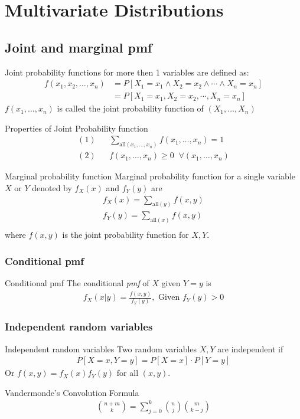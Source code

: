 \documentclass[16pt,a4paper]{article}
\begin{document}
\section{Multivariate Distributions}
\subsection{Joint and marginal pmf}
Joint probability functions for more then 1 variables are defined as: 
\begin{align*}
f(x_1, x_2, \ldots, x_n) &= P[X_1 = x_1 \wedge X_2 = x_2 \wedge \cdots \wedge X_n = x_n]\\
&= P[X_1 = x_1 , X_2 = x_2 , \cdots , X_n = x_n]
\end{align*} 
$f(x_1, \ldots, x_n)$ is called the joint probability function of $(X_1, \ldots, X_n)$ 

\begin{defn}{Properties of Joint Probability function}
\begin{align*}
(1) && \sum_{\mathrm{all}(x_1, \ldots, x_n)}f(x_1, \ldots, x_n) = 1\\
(2) && f(x_1, \ldots, x_n) \geq 0 \;\; \forall (x_1, \ldots, x_n)
\end{align*}
\end{defn}

\begin{defn}{Marginal probability function}
Marginal probability function for a single variable $X$ or $Y$ denoted by $f_X(x)$ and $f_Y(y)$ are 
\begin{align*}
f_X(x) = \sum_{\text{all}(y)} f(x,y)\\
f_Y(y) = \sum_{\text{all}(x)} f(x,y)\\
\end{align*} 
where $f(x,y)$ is the joint probability function for $X,Y$.  
\end{defn}
\subsubsection{Conditional pmf}
\begin{defn}{Conditional pmf}
The conditional \textit{pmf} of $X$ given $Y = y$ is
\begin{align*}
f_X(x | y) =  \frac{f(x,y)}{f_Y(y)}, \text{ Given $f_Y(y) > 0$}
\end{align*}
\end{defn}
\subsubsection{Independent random variables}
\begin{defn}{Independent random variables}
Two random variables $X,Y$ are independent if
\begin{align*}
P[X=x, Y=y] = P[X=x]\cdot P[Y=y]
\end{align*}
Or $f(x,y) = f_X(x)f_Y(y)$ for all $(x,y)$. 
\end{defn}
\newpage
\newpage
\begin{thm}{Vandermonde's Convolution Formula}
\begin{align*}
{n+m \choose k} = \sum_{j=0}^k {n \choose j}{m \choose k-j}
\end{align*}
\end{thm}
\end{document}
